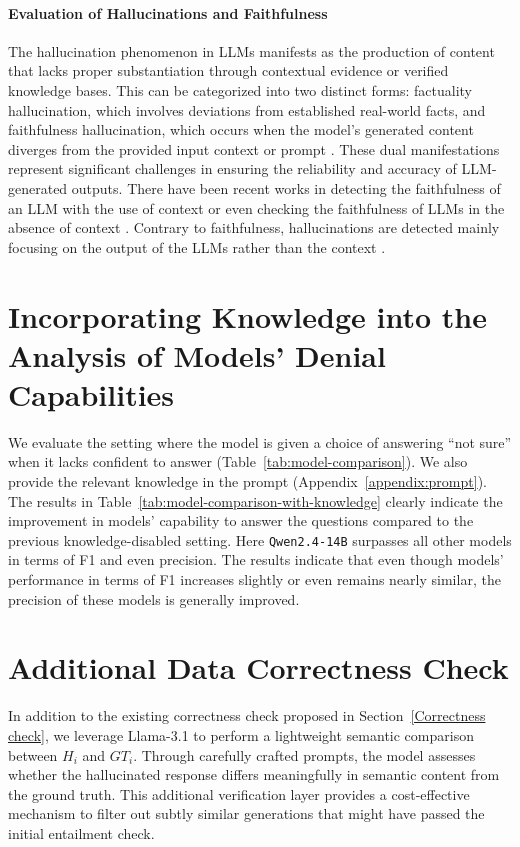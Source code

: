 \paragraph{Evaluation of Hallucinations and Faithfulness}
The hallucination phenomenon in LLMs manifests as the production of content that lacks proper substantiation through contextual evidence or verified knowledge bases. This can be categorized into two distinct forms: factuality hallucination, which involves deviations from established real-world facts, and faithfulness hallucination, which occurs when the model's generated content diverges from the provided input context or prompt \citep{Huang_2025_survey11}. These dual manifestations represent significant challenges in ensuring the reliability and accuracy of LLM-generated outputs. There have been recent works in detecting the faithfulness of an LLM with the use of context \citep{ming2024faithevallanguagemodelstay_fact4} or even checking the faithfulness of LLMs in the absence of context \citep{roller2020recipesbuildingopendomainchatbot_fact1,min2023factscorefinegrainedatomicevaluation_fact2,chern2023factoolfactualitydetectiongenerative_fact3, wei2024longformfactualitylargelanguage_fact5}. Contrary to faithfulness, hallucinations are detected mainly focusing on the output of the LLMs rather than the context \citep{Hallueval,liu2022tokenlevelreferencefreehallucinationdetection,hu2024refcheckerreferencebasedfinegrainedhallucination}. 

\section{Incorporating Knowledge into the Analysis of Models’ Denial Capabilities}
We evaluate the setting where the model is given a choice of answering ``not sure'' when it lacks confident to answer (Table~\ref{tab:model-comparison}). We also provide the relevant knowledge in the prompt (Appendix~\ref{appendix:prompt}). The results in Table~\ref{tab:model-comparison-with-knowledge} clearly indicate the improvement in models' capability to answer the questions compared to the previous knowledge-disabled setting. Here \texttt{Qwen2.4-14B} surpasses all other models in terms of F1 and even precision. The results indicate that even though models' performance in terms of F1 increases slightly or even remains nearly similar, the precision of these models is generally improved. 



\section{Additional Data Correctness Check}
In addition to the existing correctness check proposed in Section~\ref{Correctness check}, we leverage Llama-3.1 to perform a lightweight semantic comparison between $H_i$ and $GT_i$. Through carefully crafted prompts, the model assesses whether the hallucinated response differs meaningfully in semantic content from the ground truth. This additional verification layer provides a cost-effective mechanism to filter out subtly similar generations that might have passed the initial entailment check.


